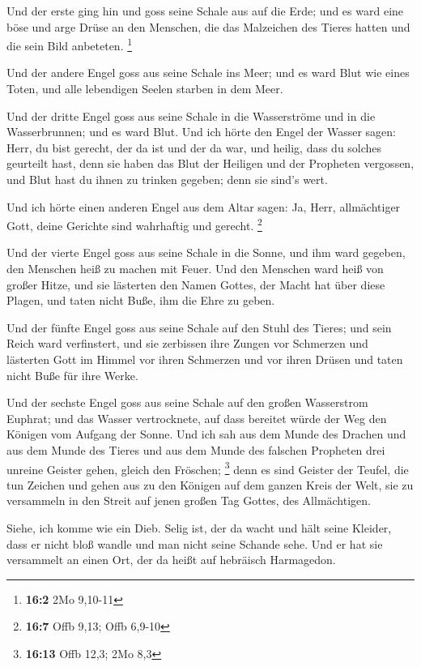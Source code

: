  Und der erste ging hin und goss seine Schale aus auf die
Erde; und es ward eine böse und arge Drüse an den Menschen, die das
Malzeichen des Tieres hatten und die sein Bild anbeteten. \footnote{\textbf{16:2}
  2Mo 9,10-11}

 Und der andere Engel goss aus seine Schale ins Meer; und
es ward Blut wie eines Toten, und alle lebendigen Seelen starben in dem
Meer.

 Und der dritte Engel goss aus seine Schale in die
Wasserströme und in die Wasserbrunnen; und es ward Blut. 
Und ich hörte den Engel der Wasser sagen: Herr, du bist gerecht, der da
ist und der da war, und heilig, dass du solches geurteilt hast,
 denn sie haben das Blut der Heiligen und der Propheten
vergossen, und Blut hast du ihnen zu trinken gegeben; denn sie sind's
wert.

 Und ich hörte einen anderen Engel aus dem Altar sagen:
Ja, Herr, allmächtiger Gott, deine Gerichte sind wahrhaftig und gerecht.
\footnote{\textbf{16:7} Offb 9,13; Offb 6,9-10}

 Und der vierte Engel goss aus seine Schale in die Sonne,
und ihm ward gegeben, den Menschen heiß zu machen mit Feuer.
 Und den Menschen ward heiß von großer Hitze, und sie
lästerten den Namen Gottes, der Macht hat über diese Plagen, und taten
nicht Buße, ihm die Ehre zu geben.

 Und der fünfte Engel goss aus seine Schale auf den Stuhl
des Tieres; und sein Reich ward verfinstert, und sie zerbissen ihre
Zungen vor Schmerzen  und lästerten Gott im Himmel vor
ihren Schmerzen und vor ihren Drüsen und taten nicht Buße für ihre
Werke.

 Und der sechste Engel goss aus seine Schale auf den
großen Wasserstrom Euphrat; und das Wasser vertrocknete, auf dass
bereitet würde der Weg den Königen vom Aufgang der Sonne.
 Und ich sah aus dem Munde des Drachen und aus dem Munde
des Tieres und aus dem Munde des falschen Propheten drei unreine Geister
gehen, gleich den Fröschen; \footnote{\textbf{16:13} Offb 12,3; 2Mo 8,3}
 denn es sind Geister der Teufel, die tun Zeichen und
gehen aus zu den Königen auf dem ganzen Kreis der Welt, sie zu
versammeln in den Streit auf jenen großen Tag Gottes, des Allmächtigen.

 Siehe, ich komme wie ein Dieb. Selig ist, der da wacht
und hält seine Kleider, dass er nicht bloß wandle und man nicht seine
Schande sehe.  Und er hat sie versammelt an einen Ort,
der da heißt auf hebräisch Harmagedon.

